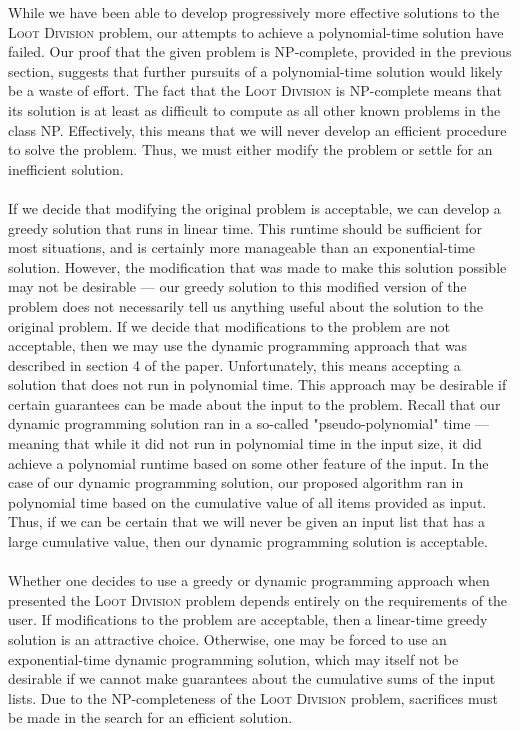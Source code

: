 \documentclass{article}
\begin{document}
While we have been able to develop progressively more effective solutions to the \textsc{Loot Division} problem, our attempts to achieve a polynomial-time solution have failed. Our proof that the given problem is NP-complete, provided in the previous section, suggests that further pursuits of a polynomial-time solution would likely be a waste of effort. The fact that the \textsc{Loot Division} is NP-complete means that its solution is at least as difficult to compute as all other known problems in the class NP. Effectively, this means that we will never develop an efficient procedure to solve the problem. Thus, we must either modify the problem or settle for an inefficient solution. \\ \\
If we decide that modifying the original problem is acceptable, we can develop a greedy solution that runs in linear time. This runtime should be sufficient for most situations, and is certainly more manageable than an exponential-time solution. However, the modification that was made to make this solution possible may not be desirable --- our greedy solution to this modified version of the problem does not necessarily tell us anything useful about the solution to the original problem. If we decide that modifications to the problem are not acceptable, then we may use the dynamic programming approach that was described in section 4 of the paper. Unfortunately, this means accepting a solution that does not run in polynomial time. This approach may be desirable if certain guarantees can be made about the input to the problem. Recall that our dynamic programming solution ran in a so-called "pseudo-polynomial" time --- meaning that while it did not run in polynomial time in the input size, it did achieve a polynomial runtime based on some other feature of the input. In the case of our dynamic programming solution, our proposed algorithm ran in polynomial time based on the cumulative value of all items provided as input. Thus, if we can be certain that we will never be given an input list that has a large cumulative value, then our dynamic programming solution is acceptable. \\ \\
Whether one decides to use a greedy or dynamic programming approach when presented the \textsc{Loot Division} problem depends entirely on the requirements of the user. If modifications to the problem are acceptable, then a linear-time greedy solution is an attractive choice. Otherwise, one may be forced to use an exponential-time dynamic programming solution, which may itself not be desirable if we cannot make guarantees about the cumulative sums of the input lists. Due to the NP-completeness of the \textsc{Loot Division} problem, sacrifices must be made in the search for an efficient solution.
\end{document}
